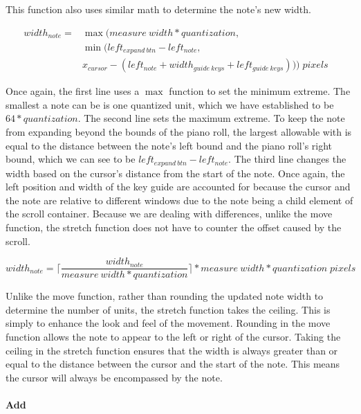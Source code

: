 This function also uses similar math to determine the note’s new width.

\begin{align} \label{stretch}
  width_{note} = & \max(measure\:width * quantization,                                                \\
                 & \min(left_{expand\:btn} - left_{note},                                             \\
                 & x_{cursor} - (left_{note} + width_{guide\:keys} + left_{guide\:keys}))) \;pixels &
\end{align}

Once again, the first line uses a $ \max $ function to set the minimum extreme. The smallest a note
can be is one quantized unit, which we have established to be $ 64 * quantization $. The second
line sets the maximum extreme. To keep the note from expanding beyond the bounds of the piano roll,
the largest allowable with is equal to the distance between the note’s left bound and the piano
roll’s right bound, which we can see to be $ left_{expand\:btn} - left_{note} $. The third line
changes the width based on the cursor’s distance from the start of the note. Once again, the left
position and width of the key guide are accounted for because the cursor and the note are relative
to different windows due to the note being a child element of the scroll container. Because we are
dealing with differences, unlike the move function, the stretch function does not have to counter
the offset caused by the scroll.

\begin{equation} \label{stretch_snap}
  width_{note} = \lceil\frac{width_{note}}{measure\:width * quantization}\rceil * measure\:width * quantization \;pixels
\end{equation}

Unlike the move function, rather than rounding the updated note width to determine the number of
units, the stretch function takes the ceiling. This is simply to enhance the look and feel of the
movement. Rounding in the move function allows the note to appear to the left or right of the
cursor. Taking the ceiling in the stretch function ensures that the width is always greater than or
equal to the distance between the cursor and the start of the note. This means the cursor will
always be encompassed by the note.

\paragraph{Add}

